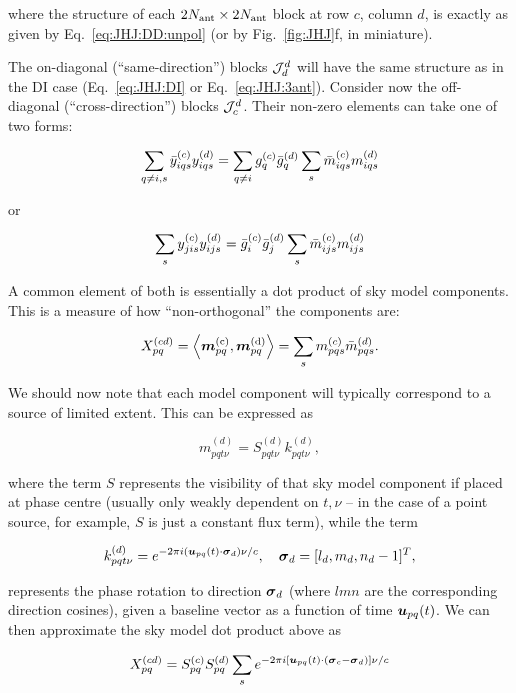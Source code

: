 \documentclass[useAMS,usenatbib]{mn2e}
\begin{document}
where the structure of each $2N_\mathrm{ant}\times2N_\mathrm{ant}$ block at row $c$, column $d$, is exactly as 
given by Eq.~\ref{eq:JHJ:DD:unpol} (or by Fig.~\ref{fig:JHJ}f, in miniature). 


The on-diagonal (``same-direction'') blocks $\mathcal{J}^d_d$ will have the same structure as in the DI 
case (Eq.~\ref{eq:JHJ:DI} or Eq.~\ref{eq:JHJ:3ant}). Consider now the off-diagonal (``cross-direction'') 
blocks $\mathcal{J}^d_c$. Their non-zero elements can take one of two forms:

\[
  \sum\limits_{q\ne i,s} \bar{y}^{(c)}_{iqs} y^{(d)}_{iqs} = \sum\limits_{q\ne i} g^{(c)}_q \bar{g}^{(d)}_q \sum_s \bar{m}^{(c)}_{iqs} m^{(d)}_{iqs}
\]

or

\begin{equation}
  \sum\limits_{s} y^{(c)}_{jis} y^{(d)}_{ijs} = \bar{g}^{(c)}_i \bar{g}^{(d)}_j \sum_s \bar{m}^{(c)}_{ijs} m^{(d)}_{ijs}
\label{eq:JHJ:DD:crossterms}
\end{equation}

A common element of both is essentially a dot product of sky model components. This is a 
measure of how ``non-orthogonal'' the components are:

\begin{equation}
\label{eq:Xpqcd}
X_{pq}^{(cd)} = \left \langle \bmath{m}_{pq}^\mathrm{(c)},\bmath{m}^\mathrm{(d)}_{pq} \right \rangle = \sum_s \mmc_{pqs} \mmdH_{pqs}.
\end{equation}

We should now note that each model component will typically correspond to a source of limited extent. This can be 
expressed as

\[
m_{pqt\nu}^{(d)} = S^{(d)}_{pqt\nu} k^{(d)}_{pqt\nu}, 
\]

where the term $S$ represents the visibility of that sky model component if placed at phase centre (usually 
only weakly dependent on $t,\nu$ -- in the case of a point source, for example, $S$ is just a constant flux term),
while the term

\[
k^{(d)}_{pqt\nu} = e^{-2\pi i (\bmath{u}_{pq}(t)\cdot\bmath{\sigma}_d)\nu/c},~~~\bmath{\sigma}_d = [l_d,m_d,n_d-1]^T,
\]

represents the phase rotation to direction $\bmath{\sigma}_d$ (where $lmn$ are the corresponding direction cosines), 
given a baseline vector as a function of time $\bmath{u}_{pq}(t)$. We can then approximate the sky model dot product above as

\[
X_{pq}^{(cd)} = S^{(c)}_{pq}S^{(d)}_{pq} \sum_s e^{-2\pi i [\bmath{u}_{pq}(t)\cdot(\bmath{\sigma}_c-\bmath{\sigma}_d) ]\nu/c}
\]
\end{document}
